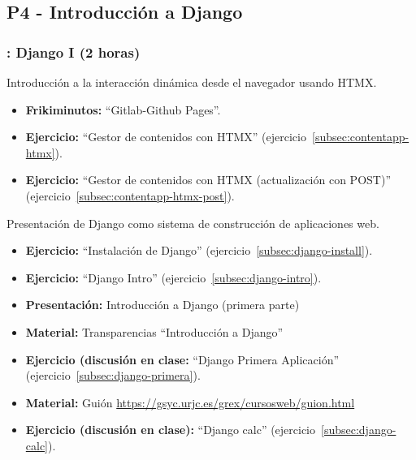 \documentclass[a4paper,12pt]{article}
\begin{document}
\subsection{P4 - Introducción a Django}

\subsubsection{\juevesG: Django I (2 horas)}
\label{cal:juevesG}
Introducción a la interacción dinámica desde el navegador usando HTMX.

\begin{itemize}
\item \textbf{Frikiminutos:} ``Gitlab-Github Pages''.
\item \textbf{Ejercicio:} ``Gestor de contenidos con HTMX'' (ejercicio~\ref{subsec:contentapp-htmx}).
\item \textbf{Ejercicio:} ``Gestor de contenidos con HTMX (actualización con POST)'' (ejercicio~\ref{subsec:contentapp-htmx-post}).
\end{itemize}

Presentación de Django como sistema de construcción de aplicaciones web.

\begin{itemize}
 \item \textbf{Ejercicio:} ``Instalación de Django'' (ejercicio~\ref{subsec:django-install}).
 \item \textbf{Ejercicio:} ``Django Intro'' (ejercicio~\ref{subsec:django-intro}).
 \item \textbf{Presentación:} Introducción a Django (primera parte)
 \item \textbf{Material:} Transparencias ``Introducción a Django''
 \item \textbf{Ejercicio (discusión en clase:} ``Django Primera Aplicación'' (ejercicio~\ref{subsec:django-primera}).
 \item \textbf{Material:} Guión \url{https://gsyc.urjc.es/grex/cursosweb/guion.html}
 \item \textbf{Ejercicio (discusión en clase):} ``Django calc'' (ejercicio~\ref{subsec:django-calc}).
 \end{itemize}


\end{document}
